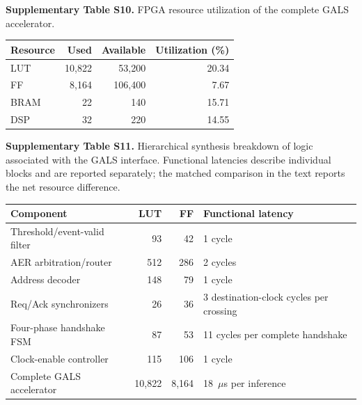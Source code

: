 \documentclass[12pt,technote,onecolumn]{IEEEtran}
\newcommand{\ResponseTableFormat}{%
  \footnotesize
  \renewcommand{\arraystretch}{1.2}%
  \setlength{\tabcolsep}{4pt}%
}
\begin{document}
\noindent\begin{minipage}{\linewidth}
\smallskip\noindent\textbf{Supplementary Table S10.} FPGA resource utilization of the complete GALS accelerator.
\begin{center}
\ResponseTableFormat
\begin{tabular*}{\linewidth}{@{\extracolsep{\fill}}lrrr@{}}
\toprule
Resource & Used & Available & Utilization (\%) \\
\midrule
LUT & 10,822 & 53,200 & 20.34 \\
FF & 8,164 & 106,400 & 7.67 \\
BRAM & 22 & 140 & 15.71 \\
DSP & 32 & 220 & 14.55 \\
\bottomrule
\end{tabular*}
\end{center}
\end{minipage}\par\medskip

\noindent\begin{minipage}{\linewidth}
\smallskip\noindent\textbf{Supplementary Table S11.} Hierarchical synthesis breakdown of logic associated with the GALS interface. Functional latencies describe individual blocks and are reported separately; the matched comparison in the text reports the net resource difference.
\begin{center}
\ResponseTableFormat
\begin{tabular*}{\linewidth}{@{\extracolsep{\fill}}lrrl@{}}
\toprule
Component & LUT & FF & Functional latency \\
\midrule
Threshold/event-valid filter & 93 & 42 & 1 cycle \\
AER arbitration/router & 512 & 286 & 2 cycles \\
Address decoder & 148 & 79 & 1 cycle \\
Req/Ack synchronizers & 26 & 36 & 3 destination-clock cycles per crossing \\
Four-phase handshake FSM & 87 & 53 & 11 cycles per complete handshake \\
Clock-enable controller & 115 & 106 & 1 cycle \\
Complete GALS accelerator & 10,822 & 8,164 & 18~$\mu$s per inference \\
\bottomrule
\end{tabular*}
\end{center}
\end{minipage}\par\medskip
\end{document}
